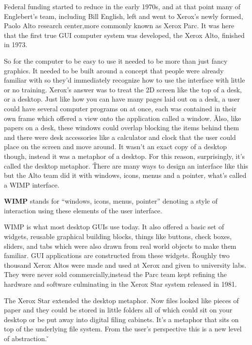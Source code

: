 Federal funding started to reduce in the early 1970s, and at that point many of Englebert's team, including Bill
English, left and went to Xerox's newly formed, Paolo Alto research center,more commonly known as Xerox Parc. It was
here that the first true GUI computer system was developed, the Xerox Alto, finished in 1973.


So for the computer to be easy to use it needed to be more than just fancy graphics. It needed to be built around a
concept that people were already familiar with so they'd immediately recognize how to use the interface with little
or no training. Xerox's answer was to treat the 2D screen like the top of a desk, or a desktop. Just like how you can
have many pages laid out on a desk, a user could have several computer programs on at once, each was contained in
their own frame which offered a view onto the application called a window. \v

Also, like papers on a desk, these windows could overlap blocking the items behind them and there were desk
accessories like a calculator and clock that the user could place on the screen and move around. It wasn't an exact
copy of a desktop though, instead it was a metaphor of a desktop. For this reason, surprisingly, it's called the
desktop metaphor. \v

There are many ways to design an interface like this but the Alto team did it with windows, icons, menus and a
pointer, what's called a WIMP interface.

\bd[WIMP]
\textbf{WIMP} stands for ``windows, icons, menus, pointer'' denoting a style of interaction using these elements of the
user interface.
\ed

WIMP is what most desktop GUIs use today. It also offered a basic set of widgets, reusable graphical building blocks,
things like buttons, check boxes, sliders, and tabs which were also drawn from real world objects to make them
familiar. GUI applications are constructed from these widgets. \v

Roughly two thousand Xerox Altos were made and used at Xerox and given to university labs. They were never sold
commercially,instead the Parc team kept refining the hardware and software culminating in the Xerox Star system
released in 1981.


The Xerox Star extended the desktop metaphor. Now files looked like pieces of paper and they could be stored in
little folders all of which could sit on your desktop or be put away into digital filing cabinets. It's a metaphor
that sits on top of the underlying file system. From the user's perspective this is a new level of abstraction. \v


